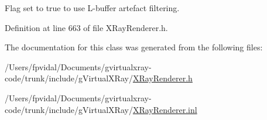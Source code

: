 Flag set to true to use L-\/buffer artefact filtering. 



Definition at line 663 of file XRayRenderer.h.



The documentation for this class was generated from the following files:\begin{DoxyCompactItemize}
\item 
/Users/fpvidal/Documents/gvirtualxray-\/code/trunk/include/gVirtualXRay/\hyperlink{_x_ray_renderer_8h}{XRayRenderer.h}\item 
/Users/fpvidal/Documents/gvirtualxray-\/code/trunk/include/gVirtualXRay/\hyperlink{_x_ray_renderer_8inl}{XRayRenderer.inl}\end{DoxyCompactItemize}
